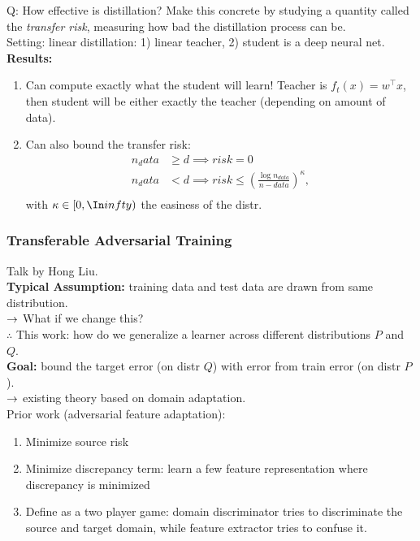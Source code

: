 Q: How effective is distillation? Make this concrete by studying a quantity called the {\it transfer risk}, measuring how bad the distillation process can be. \\

Setting: linear distillation: 1) linear teacher, 2) student is a deep neural net. \\

{\bf Results:}
\begin{enumerate}
    \item Can compute exactly what the student will learn! Teacher is $f_t(x) = w^\top x$, then student will be either exactly the teacher (depending on amount of data).
    \item Can also bound the transfer risk:
    \begin{align}
        n_data &\geq d \implies risk = 0 \\
        n_data &< d \implies risk \leq \left(\frac{\log n_{data}}{n-data}\right)^\kappa, \\
    \end{align}
    with $\kappa \in [0,\In infty)$ the easiness of the distr.
\end{enumerate}

\spacerule

\subsubsection{Transferable Adversarial Training~\cite{liu2019transferable}}

Talk by Hong Liu. \\

{\bf Typical Assumption:} training data and test data are drawn from same distribution. \\

$\rightarrow$ What if we change this? \\

$\therefore$ This work: how do we generalize a learner across different distributions $P$ and $Q$. \\

{\bf Goal:} bound the target error (on distr $Q$) with error from train error (on distr $P$). \\

$\rightarrow$ existing theory based on domain adaptation. \\

Prior work (adversarial feature adaptation):
\begin{enumerate}
    \item Minimize source risk
    \item Minimize discrepancy term: learn a few feature representation where discrepancy is minimized
    \item Define as a two player game: domain discriminator tries to discriminate the source and target domain, while feature extractor tries to confuse it.
\end{enumerate}

